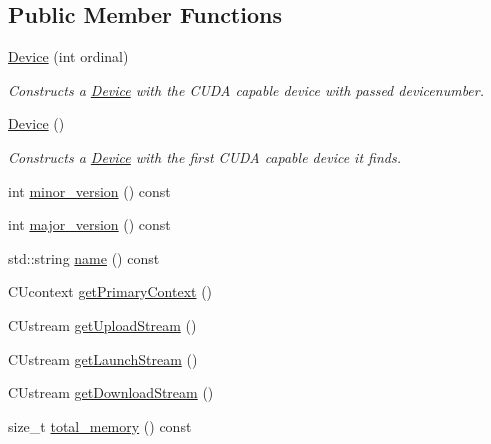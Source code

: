 \subsection*{Public Member Functions}
\begin{DoxyCompactItemize}
\item 
\mbox{\label{classyacx_1_1_device_a4d6a77e872d111010c7f7e246cb412a4}} 
\hyperlink{classyacx_1_1_device_a4d6a77e872d111010c7f7e246cb412a4}{Device} (int ordinal)
\begin{DoxyCompactList}\small\item\em Constructs a \hyperlink{classyacx_1_1_device}{Device} with the C\+U\+DA capable device with passed devicenumber. \end{DoxyCompactList}\item 
\mbox{\label{classyacx_1_1_device_ab661f7dcdc107c892064cc7c52e2b0f9}} 
\hyperlink{classyacx_1_1_device_ab661f7dcdc107c892064cc7c52e2b0f9}{Device} ()
\begin{DoxyCompactList}\small\item\em Constructs a \hyperlink{classyacx_1_1_device}{Device} with the first C\+U\+DA capable device it finds. \end{DoxyCompactList}\item 
int \hyperlink{classyacx_1_1_device_a5d7a0d5f9c543768323cfc8807d9aa27}{minor\+\_\+version} () const
\item 
int \hyperlink{classyacx_1_1_device_ac72d60151e4070d118cd0aadd0d7d448}{major\+\_\+version} () const
\item 
std\+::string \hyperlink{classyacx_1_1_device_a49388d8375dc98070973470f6cd997e8}{name} () const
\item 
C\+Ucontext \hyperlink{classyacx_1_1_device_a9227417e61e545bed24aeb72272bf277}{get\+Primary\+Context} ()
\item 
C\+Ustream \hyperlink{classyacx_1_1_device_a9b226ea765e496ca388a466875f40d72}{get\+Upload\+Stream} ()
\item 
C\+Ustream \hyperlink{classyacx_1_1_device_a51d568a0c576533dab7a3d2bbe5c2214}{get\+Launch\+Stream} ()
\item 
C\+Ustream \hyperlink{classyacx_1_1_device_a5304b1ba9e1fc512caa64041b39f13fd}{get\+Download\+Stream} ()
\item 
size\+\_\+t \hyperlink{classyacx_1_1_device_a14acbcda1fdf398b018ee329406b9c7b}{total\+\_\+memory} () const
\item 

\end{DoxyCompactItemize}
